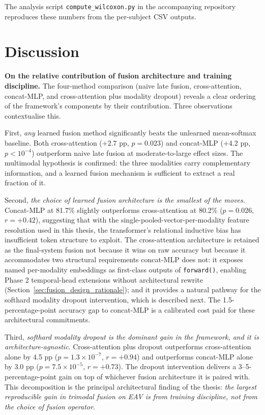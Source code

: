 The analysis script \texttt{compute\_wilcoxon.py} in the accompanying repository reproduces these numbers from the per-subject CSV outputs.

\section{Discussion}
\textbf{On the relative contribution of fusion architecture and training discipline.} The four-method comparison (naive late fusion, cross-attention, concat-MLP, and cross-attention plus modality dropout) reveals a clear ordering of the framework's components by their contribution. Three observations contextualise this.

First, \emph{any} learned fusion method significantly beats the unlearned mean-softmax baseline. Both cross-attention ($+2.7$ pp, $p=0.023$) and concat-MLP ($+4.2$ pp, $p<10^{-4}$) outperform naive late fusion at moderate-to-large effect sizes. The multimodal hypothesis is confirmed: the three modalities carry complementary information, and a learned fusion mechanism is sufficient to extract a real fraction of it.

Second, \emph{the choice of learned fusion architecture is the smallest of the moves}. Concat-MLP at 81.7\% slightly outperforms cross-attention at 80.2\% ($p=0.026$, $r=+0.42$), suggesting that with the single-pooled-vector-per-modality feature resolution used in this thesis, the transformer's relational inductive bias has insufficient token structure to exploit. The cross-attention architecture is retained as the final-system fusion not because it wins on raw accuracy but because it accommodates two structural requirements concat-MLP does not: it exposes named per-modality embeddings as first-class outputs of \texttt{forward()}, enabling Phase 2 temporal-head extensions without architectural rewrite (Section~\ref{sec:fusion_design_rationale}); and it provides a natural pathway for the softhard modality dropout intervention, which is described next. The 1.5-percentage-point accuracy gap to concat-MLP is a calibrated cost paid for these architectural commitments.

Third, \emph{softhard modality dropout is the dominant gain in the framework, and it is architecture-agnostic}. Cross-attention plus dropout outperforms cross-attention alone by 4.5 pp ($p = 1.3 \times 10^{-7}$, $r = +0.94$) and outperforms concat-MLP alone by 3.0 pp ($p = 7.5 \times 10^{-5}$, $r = +0.73$). The dropout intervention delivers a 3--5-percentage-point gain on top of whichever fusion architecture it is paired with. This decomposition is the principal architectural finding of the thesis: \emph{the largest reproducible gain in trimodal fusion on EAV is from training discipline, not from the choice of fusion operator}.

